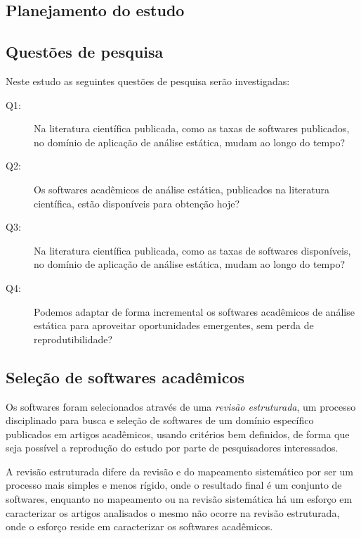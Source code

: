 \subsection{Planejamento do estudo}

\subsection{Questões de pesquisa}

Neste estudo as seguintes questões de pesquisa serão investigadas:

\newcommand{\QuestaoUm}{Na literatura científica publicada, como as taxas de
softwares publicados, no domínio de aplicação de análise estática, mudam ao
longo do tempo?}

\newcommand{\QuestaoDois}{Os softwares acadêmicos de análise estática, publicados
na literatura científica, estão disponíveis para obtenção hoje?}

\newcommand{\QuestaoTres}{Na literatura científica publicada, como as taxas de
softwares disponíveis, no domínio de aplicação de análise estática, mudam ao
longo do tempo?}

\newcommand{\QuestaoQuatro}{Podemos adaptar de forma incremental os softwares
acadêmicos de análise estática para aproveitar oportunidades emergentes, sem
perda de reprodutibilidade?}

\begin{description}
  \item [Q1:] \QuestaoUm
  \item [Q2:] \QuestaoDois
  \item [Q3:] \QuestaoTres
  \item [Q4:] \QuestaoQuatro
\end{description}

\subsection{Seleção de softwares acadêmicos}

Os softwares foram selecionados através de uma {\it revisão estruturada}, um processo disciplinado
para busca e seleção de softwares de um domínio específico publicados em
artigos acadêmicos, usando critérios bem definidos, de forma que seja
possível a reprodução do estudo por parte de pesquisadores interessados.

A revisão estruturada difere da revisão e do mapeamento sistemático
\cite{Kitchenham2007} por ser um processo mais simples e menos rígido, onde o
resultado final é um conjunto de softwares, enquanto no mapeamento ou na
revisão sistemática há um esforço em caracterizar os artigos analisados o mesmo
não ocorre na revisão estruturada, onde o esforço reside em caracterizar os
softwares acadêmicos.

